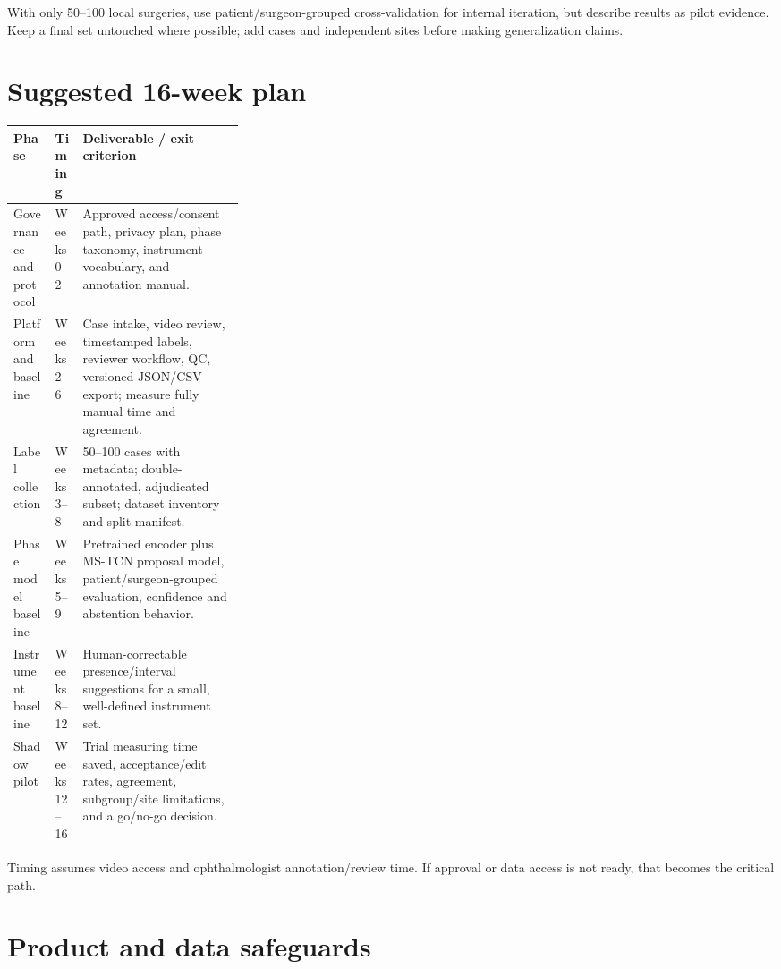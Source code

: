 \documentclass[11pt,a4paper]{article}
\begin{document}
With only 50--100 local surgeries, use patient/surgeon-grouped cross-validation for internal iteration, but describe results as pilot evidence. Keep a final set untouched where possible; add cases and independent sites before making generalization claims.

\section{Suggested 16-week plan}

\small
\begin{tabularx}{\linewidth}{@{}p{0.18\linewidth}p{0.12\linewidth}X@{}}
\toprule
\textbf{Phase} & \textbf{Timing} & \textbf{Deliverable / exit criterion} \\
\midrule
Governance and protocol & Weeks 0--2 & Approved access/consent path, privacy plan, phase taxonomy, instrument vocabulary, and annotation manual. \\
Platform and baseline & Weeks 2--6 & Case intake, video review, timestamped labels, reviewer workflow, QC, versioned JSON/CSV export; measure fully manual time and agreement. \\
Label collection & Weeks 3--8 & 50--100 cases with metadata; double-annotated, adjudicated subset; dataset inventory and split manifest. \\
Phase model baseline & Weeks 5--9 & Pretrained encoder plus MS-TCN proposal model, patient/surgeon-grouped evaluation, confidence and abstention behavior. \\
Instrument baseline & Weeks 8--12 & Human-correctable presence/interval suggestions for a small, well-defined instrument set. \\
Shadow pilot & Weeks 12--16 & Trial measuring time saved, acceptance/edit rates, agreement, subgroup/site limitations, and a go/no-go decision. \\
\bottomrule
\end{tabularx}
\normalsize

\medskip
Timing assumes video access and ophthalmologist annotation/review time. If approval or data access is not ready, that becomes the critical path.

\section{Product and data safeguards}
\end{document}
